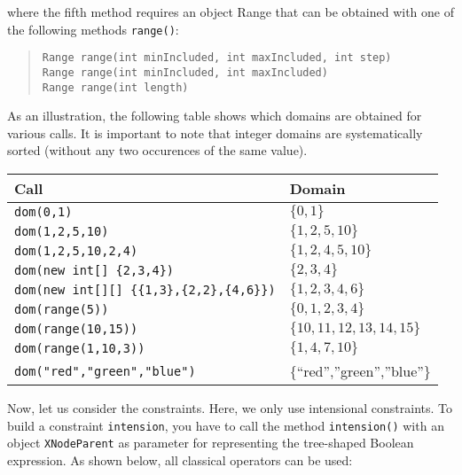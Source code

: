 \documentclass[10pt]{article}
\newcommand{\gb}[1]{{\tt #1}} %
\newcommand{\nn}[1]{{\tt #1}} %
\begin{document}
where the fifth method requires an object Range that can be obtained with one of the following methods \nn{range()}: 
\begin{quote}
\begin{verbatim}
Range range(int minIncluded, int maxIncluded, int step) 
Range range(int minIncluded, int maxIncluded) 
Range range(int length) 
\end{verbatim}
\end{quote}

  
As an illustration, the following table shows which domains are obtained for various calls.
It is important to note that integer domains are systematically sorted (without any two occurences of the same value).

\medskip\begin{tabular}{ll}
  \toprule
Call & Domain \\
  \midrule
  \verb!dom(0,1)! & $\{0,1\}$  \\
\verb!dom(1,2,5,10)! & $\{1,2,5,10\}$  \\
\verb!dom(1,2,5,10,2,4)! & $\{1,2,4,5,10\}$  \\
\verb!dom(new int[] {2,3,4})! & $\{2,3,4\}$  \\
\verb!dom(new int[][] {{1,3},{2,2},{4,6}})! & $\{1,2,3,4,6\}$  \\
\verb!dom(range(5))! & $\{0,1,2,3,4\}$  \\
\verb!dom(range(10,15))! & $\{10,11,12,13,14,15\}$  \\
\verb!dom(range(1,10,3))! & $\{1,4,7,10\}$  \\
\verb!dom("red","green","blue")! & $\{$``red'',''green'',''blue''$\}$  \\
\bottomrule
\end{tabular}
\bigskip


Now, let us consider the constraints.
Here, we only use intensional constraints.
To build a constraint \gb{intension}, you have to call the method \nn{intension()} with an object \nn{XNodeParent} as parameter for representing the tree-shaped Boolean expression.
As shown below, all classical operators can be used:
\end{document}
